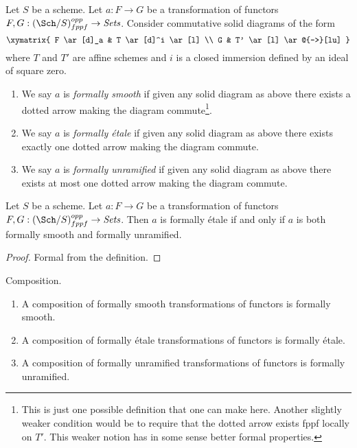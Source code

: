 \begin{definition}
\label{definition-formally-smooth-etale-unramified}
Let $S$ be a scheme.
Let $a : F \to G$ be a transformation of functors
$F, G : (\Sch/S)_{fppf}^{opp} \to \textit{Sets}$.
Consider commutative solid diagrams of the form
$$
\xymatrix{
F \ar[d]_a & T \ar[d]^i \ar[l] \\
G & T' \ar[l] \ar@{-->}[lu]
}
$$
where $T$ and $T'$ are affine schemes and $i$ is a closed immersion
defined by an ideal of square zero.
\begin{enumerate}
\item We say $a$ is {\it formally smooth} if given any solid
diagram as above there exists a dotted arrow making the diagram
commute\footnote{This is just one possible definition that one can
make here. Another slightly weaker condition would be to require that
the dotted arrow exists fppf locally on $T'$. This weaker notion
has in some sense better formal properties.}.
\item We say $a$ is {\it formally \'etale} if given any solid
diagram as above there exists exactly one dotted arrow making the diagram
commute.
\item We say $a$ is {\it formally unramified} if given any solid
diagram as above there exists at most one dotted arrow making the diagram
commute.
\end{enumerate}
\end{definition}

\begin{lemma}
\label{lemma-formally-etale-is-combination}
Let $S$ be a scheme.
Let $a : F \to G$ be a transformation of functors
$F, G : (\Sch/S)_{fppf}^{opp} \to \textit{Sets}$.
Then $a$ is formally \'etale if and only if $a$ is both formally
smooth and formally unramified.
\end{lemma}

\begin{proof}
Formal from the definition.
\end{proof}

\begin{lemma}
\label{lemma-composition-formally-smooth-etale-unramified}
Composition.
\begin{enumerate}
\item A composition of formally smooth transformations of functors is formally
smooth.
\item A composition of formally \'etale transformations of functors is formally
\'etale.
\item A composition of formally unramified transformations of functors is
formally unramified.
\end{enumerate}
\end{lemma}

